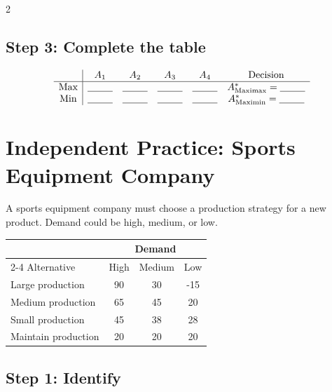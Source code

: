 \begin{multicols}{2}
		\subsection*{Step 3: Complete the table}
		\[
		\begin{array}{c|ccccc}
			& A_1 & A_2 & A_3 & A_4 & \text{Decision}\\
			\hline
			\text{Max} &
			\underline{\hspace{0.9cm}} &
			\underline{\hspace{0.9cm}} &
			\underline{\hspace{0.9cm}} &
			\underline{\hspace{0.9cm}} &
			A^*_{\mathrm{Maximax}} = \underline{\hspace{0.9cm}}
			\\
			\text{Min} &
			\underline{\hspace{0.9cm}} &
			\underline{\hspace{0.9cm}} &
			\underline{\hspace{0.9cm}} &
			\underline{\hspace{0.9cm}} &
			A^*_{\mathrm{Maximin}} = \underline{\hspace{0.9cm}}
		\end{array}
		\]
		
		\section{Independent Practice: Sports Equipment Company}
		
		A sports equipment company must choose a production strategy for a new
		product. Demand could be high, medium, or low.
		
		\begin{center}
			\renewcommand{\arraystretch}{1.3}
			\small
			\begin{tabular}{lccc}
				\toprule
				& \multicolumn{3}{c}{Demand} \\
				\cmidrule(lr){2-4}
				Alternative & High & Medium & Low \\
				\midrule
				Large production  & 90 & 30 & -15 \\
				Medium production & 65 & 45 & 20 \\
				Small production & 45 & 38 & 28 \\
				Maintain production & 20 & 20 & 20 \\
				\bottomrule
			\end{tabular}
		\end{center}
		\subsection*{Step 1: Identify}
		

\end{multicols}
